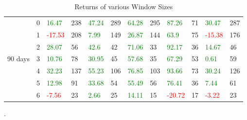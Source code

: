 \begin{table}[!htb]
\begin{adjustwidth}{-0.8in}{-0.9in}
\begin{tabular}{|p{4em}|p{2em}|p{3em}|p{3em}|p{3em}|p{3em}|p{3em}|p{3em}|p{3em}|p{3em}|p{3em}|p{3em}|}
            & 0 & \textcolor{green}{16.47} & 238 & \textcolor{green}{47.24} & 289 & \textcolor{green}{64.28} & 295 & \textcolor{green}{87.26} & 71 & \textcolor{green}{30.47} & 287\\\cline{3-12}
            & 1 & \textcolor{red}{-17.53} & 208 & \textcolor{green}{7.99} & 149 & \textcolor{green}{26.87} & 144 & \textcolor{green}{63.9} & 75 & \textcolor{red}{-15.38} & 176\\\cline{3-12}
            & 2 & \textcolor{green}{28.07} & 56 & \textcolor{green}{42.6} & 42 & \textcolor{green}{71.06} & 33 & \textcolor{green}{92.17} & 36 & \textcolor{green}{14.67} & 46\\\cline{3-12}
            90 days & 3 & \textcolor{green}{10.76} & 78 & \textcolor{green}{30.95} & 45 & \textcolor{green}{57.68} & 35 & \textcolor{green}{67.29} & 53 & \textcolor{green}{0.61} & 59\\\cline{3-12}
            & 4 & \textcolor{green}{32.23} & 137 & \textcolor{green}{55.23} & 106 & \textcolor{green}{76.85} & 103 & \textcolor{green}{93.66} & 73 & \textcolor{green}{30.24} & 126\\\cline{3-12}
            & 5 & \textcolor{green}{12.98} & 91 & \textcolor{green}{33.68} & 54 & \textcolor{green}{55.49} & 56 & \textcolor{green}{76.41} & 36 & \textcolor{green}{7.44} & 61\\\cline{3-12}
            & 6 & \textcolor{red}{-7.56} & 23 & \textcolor{green}{2.66} & 25 & \textcolor{green}{14.11} & 15 & \textcolor{red}{-20.72} & 17 & \textcolor{red}{-3.22} & 23\\\hline
            
        \end{tabular}
    \end{adjustwidth}
    \caption{Returns of various Window Sizes \label{tab:VaryWS}}.
\end{table}

